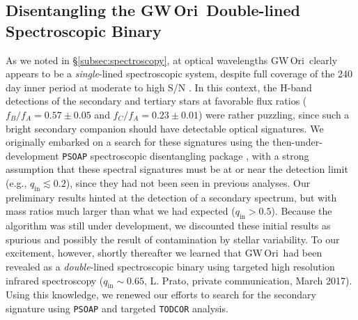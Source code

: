 \documentclass[twocolumn]{aastex61}
\newcommand{\obj}{GW\,Ori}
\begin{document}
\subsection{Disentangling the \obj\ Double-lined Spectroscopic Binary}
\label{subsec:disentangle}
As we noted in \S\ref{subsec:spectroscopy}, at optical wavelengths \obj\ clearly appears to be a \emph{single}-lined spectroscopic system, despite full coverage of the 240 day inner period at moderate to high S/N \citep{mathieu91,fang14}. In this context, the \citet{berger11} H-band detections of the secondary and tertiary stars at favorable flux ratios ($f_B / f_A = 0.57 \pm 0.05$ and $f_C / f_A = 0.23 \pm 0.01$) were rather puzzling, since such a bright secondary companion should have detectable optical signatures. We originally embarked on a search for these signatures using the then-under-development \texttt{PSOAP} spectroscopic disentangling package \citep{czekala17}, with a strong assumption that these spectral signatures must be at or near the detection limit (e.g., $q_\mathrm{in} \lesssim 0.2$), since they had not been seen in previous analyses. Our preliminary results hinted at the detection of a secondary spectrum, but with mass ratios much larger than what we had expected ($q_\mathrm{in} > 0.5$). Because the algorithm was still under development, we discounted these initial results as spurious and possibly the result of contamination by stellar variability.
To our excitement, however, shortly thereafter we learned that \obj\ had been revealed as a \emph{double}-lined spectroscopic binary using targeted high resolution infrared spectroscopy ($q_\mathrm{in} \sim 0.65$, L. Prato, private communication, March 2017). Using this knowledge, we renewed our efforts to search for the secondary signature using \texttt{PSOAP} and targeted \texttt{TODCOR} analysis.
\end{document}
